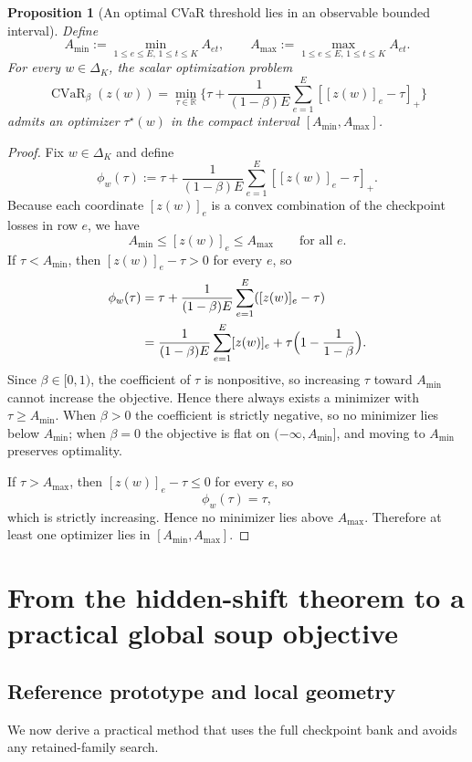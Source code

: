 \documentclass[11pt]{article}
\newcommand{\R}{\mathbb{R}}
\newcommand{\1}{\mathbf{1}}
\newcommand{\cvar}{\operatorname{CVaR}}
\newcommand{\Dset}{\Delta_K}
\theoremstyle{plain}
\newtheorem{proposition}[theorem]{Proposition}
\theoremstyle{definition}
\theoremstyle{remark}
\begin{document}
\begin{proposition}[An optimal CVaR threshold lies in an observable bounded interval]\label{prop:tau_interval}
Define
\[
A_{\min} := \min_{1\le e\le E,\,1\le t\le K} A_{et},
\qquad
A_{\max} := \max_{1\le e\le E,\,1\le t\le K} A_{et}.
\]
For every $w\in\Dset$, the scalar optimization problem
\[
\cvar_{\beta}(z(w))
= \min_{\tau\in\R}\Biggl\{\tau + \frac{1}{(1-\beta)E}\sum_{e=1}^E [[z(w)]_e-\tau]_+\Biggr\}
\]
admits an optimizer $\tau^\star(w)$ in the compact interval $[A_{\min},A_{\max}]$.
\end{proposition}

\begin{proof}
Fix $w\in\Dset$ and define
\[
\phi_w(\tau) := \tau + \frac{1}{(1-\beta)E}\sum_{e=1}^E [[z(w)]_e-\tau]_+.
\]
Because each coordinate $[z(w)]_e$ is a convex combination of the checkpoint losses in row $e$, we have
\[
A_{\min} \le [z(w)]_e \le A_{\max}
\qquad \text{for all } e.
\]
If $\tau < A_{\min}$, then $[z(w)]_e-\tau > 0$ for every $e$, so
\begin{align*}
\phi_w(\tau)
&= \tau + \frac{1}{(1-\beta)E}\sum_{e=1}^E ([z(w)]_e-\tau) \\
&= \frac{1}{(1-\beta)E}\sum_{e=1}^E [z(w)]_e + \tau\Bigl(1-\frac{1}{1-\beta}\Bigr).
\end{align*}
Since $\beta\in[0,1)$, the coefficient of $\tau$ is nonpositive, so increasing $\tau$ toward $A_{\min}$ cannot increase the objective. Hence there always exists a minimizer with $\tau\ge A_{\min}$. When $\beta>0$ the coefficient is strictly negative, so no minimizer lies below $A_{\min}$; when $\beta=0$ the objective is flat on $(-\infty,A_{\min}]$, and moving to $A_{\min}$ preserves optimality.

If $\tau > A_{\max}$, then $[z(w)]_e-\tau \le 0$ for every $e$, so
\[
\phi_w(\tau)=\tau,
\]
which is strictly increasing. Hence no minimizer lies above $A_{\max}$.
Therefore at least one optimizer lies in $[A_{\min},A_{\max}]$.
\end{proof}

\section{From the hidden-shift theorem to a practical global soup objective}
\subsection{Reference prototype and local geometry}
We now derive a practical method that uses the full checkpoint bank and avoids any retained-family search.
\end{document}
